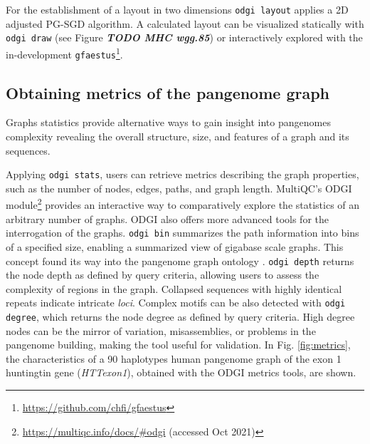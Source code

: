 \documentclass{bioinfo}
\begin{document}
For the establishment of a layout in two dimensions \texttt{odgi layout} applies a 2D adjusted PG-SGD algorithm. A calculated layout can be visualized statically with \texttt{odgi draw} (see Figure \textit{\textbf{TODO MHC wgg.85}}) or interactively explored with the in-development \texttt{gfaestus}\footnote{\url{https://github.com/chfi/gfaestus}}.

\subsection{Obtaining metrics of the pangenome graph}





Graphs statistics provide alternative ways to gain insight into pangenomes complexity revealing the overall structure, size, and features of a graph and its sequences. 

Applying \texttt{odgi stats}, users can retrieve metrics describing the graph properties, such as the number of nodes, edges, paths, and graph length. 
MultiQC's \citep{Ewels_2016} ODGI module\footnote{\url{https://multiqc.info/docs/\#odgi} (accessed Oct 2021)} provides an interactive way to comparatively explore the statistics of an arbitrary number of graphs. 
ODGI also offers more advanced tools for the interrogation of the graphs. \texttt{odgi bin} summarizes the path information into bins of a specified size, enabling a summarized view of gigabase scale graphs. 
This concept found its way into the pangenome graph ontology \cite{Yokoyama2020}. \texttt{odgi depth} returns the node depth as defined by query criteria, allowing users to assess the complexity of regions in the graph. 
Collapsed sequences with highly identical repeats indicate intricate \textit{loci}. 
Complex motifs can be also detected with \texttt{odgi degree}, which returns the node degree as defined by query criteria. 
High degree nodes can be the mirror of variation, misassemblies, or problems in the pangenome building, making the tool useful for validation. 
In Fig. \ref{fig:metrics}, the characteristics of a 90 haplotypes human pangenome graph of the exon 1 huntingtin gene \citep{Sathasivam2013,Neueder2017} (\textit{HTTexon1}), obtained with the ODGI metrics tools, are shown.
\end{document}
